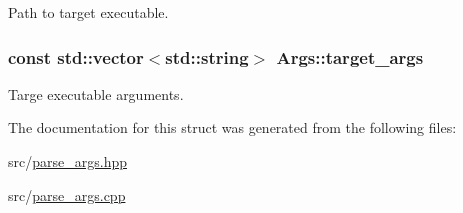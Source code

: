 Path to target executable. 

\subsubsection[{\texorpdfstring{target\+\_\+args}{target_args}}]{\setlength{\rightskip}{0pt plus 5cm}const std\+::vector$<$std\+::string$>$ Args\+::target\+\_\+args}\hypertarget{struct_args_aa9f8e387df0b3691352daf352876176d}{}\label{struct_args_aa9f8e387df0b3691352daf352876176d}


Targe executable arguments. 



The documentation for this struct was generated from the following files\+:\begin{DoxyCompactItemize}
\item 
src/\hyperlink{parse__args_8hpp}{parse\+\_\+args.\+hpp}\item 
src/\hyperlink{parse__args_8cpp}{parse\+\_\+args.\+cpp}\end{DoxyCompactItemize}
